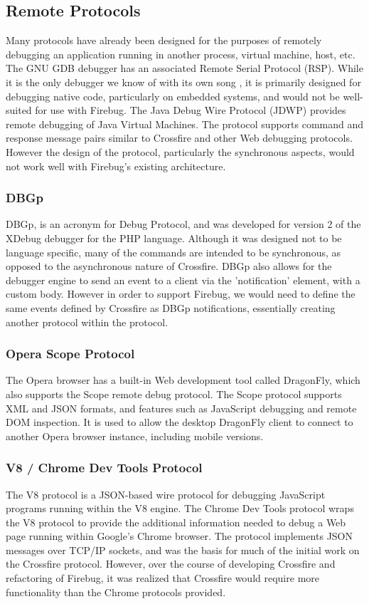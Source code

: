 \subsection{Remote Protocols}
Many protocols have already been designed for the purposes of remotely debugging
an application running in another process, virtual machine, host, etc. The GNU
GDB debugger has an associated Remote Serial Protocol (RSP)\cite{gdb-rsp}. While
it is the only debugger we know of with its own song \cite{gdb-song}, it is
primarily designed for debugging native code, particularly on embedded
systems, and would not be well-suited for use with Firebug. The Java Debug Wire Protocol (JDWP)
\cite{jdwp} provides remote debugging of Java Virtual Machines. The protocol
supports command and response message pairs similar to Crossfire and other Web
debugging protocols. However the design of the protocol, particularly the
synchronous aspects, would not work well with Firebug's existing architecture.

\subsubsection{DBGp}
DBGp\cite{dbgp}, is an acronym for Debug Protocol, and was developed for version
2 of the XDebug debugger for the PHP language. Although it was designed not to
be language specific, many of the commands are intended to be synchronous, as
opposed to the asynchronous nature of Crossfire. DBGp also allows for the
debugger engine to send an event to a client via the 'notification' element,
with a custom body. However in order to support Firebug, we would need to define
the same events defined by Crossfire as DBGp notifications, essentially creating
another protocol within the protocol.

\subsubsection{Opera Scope Protocol}
The Opera browser has a built-in Web development tool called DragonFly, which
also supports the Scope remote debug protocol. The Scope
protocol\cite{opera-scope} supports XML and JSON formats, and features such as
JavaScript debugging and remote DOM inspection. It is used to allow the desktop
DragonFly client to connect to another Opera browser instance, including mobile
versions.

\subsubsection{V8 / Chrome Dev Tools Protocol}
The V8 protocol\cite{v8} is a JSON-based wire protocol for debugging JavaScript
programs running within the V8 engine. The Chrome Dev Tools
protocol\cite{chrome-dev-tools} wraps the V8 protocol to provide the additional
information needed to debug a Web page running within Google's Chrome browser.
The protocol implements JSON messages over TCP/IP sockets, and was the basis for
much of the initial work on the Crossfire protocol. However, over the course of
developing Crossfire and refactoring of Firebug, it was realized that Crossfire
would require more functionality than the Chrome protocols provided.


